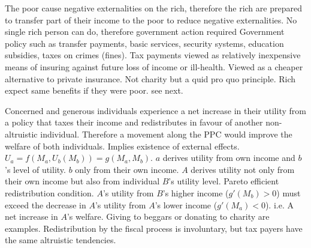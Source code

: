 \documentclass[12pt]{examnotes}
\begin{document}
\ra The poor cause negative externalities on the rich, therefore the rich are prepared to transfer part of their income to the poor to reduce negative externalities.
\ra No single rich person can do, therefore government action required
\ra Government policy such as transfer payments, basic services, security systems, education subsidies, taxes on crimes (fines).
\ra Tax payments viewed as relatively inexpensive means of insuring against future loss of income or ill-health. 
\ra Viewed as a cheaper alternative to private insurance.
\ra Not charity but a quid pro quo principle. Rich expect same benefits if they were poor.
 see next.

\ra Concerned and generous individuals experience a net increase in their utility from a policy that taxes their income and redistributes in favour of another non-altruistic individual.
\ra Therefore a movement along the PPC would improve the welfare of both individuals.
\ra Implies existence of external effects.
\ra $U_a=f(M_a,U_b(M_b))=g(M_a,M_b)$. $a$ derives utility from own income and $b$'s level of utility. $b$ only from their own income.
\ra $A$ derives utility not only from their own income but also from individual $B$'s utility level.
\ra Pareto efficient redistribution condition. $A$'s utility from $B$'s higher income ($g'(M_b) > 0$) must exceed the decrease in $A$'s utility from $A$'s lower income ($g'(M_a) < 0$). i.e. A net increase in $A$'s welfare.
\ra Giving to beggars or donating to charity are examples.
\ra Redistribution by the fiscal process is involuntary, but tax payers have the same altruistic tendencies.
\end{document}
